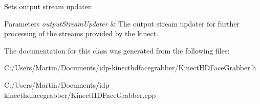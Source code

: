 Sets output stream updater. 


\begin{DoxyParams}{Parameters}
{\em output\+Stream\+Updater} & The output stream updater for further processing of the streams provided by the kinect. \\
\hline
\end{DoxyParams}


The documentation for this class was generated from the following files\+:\begin{DoxyCompactItemize}
\item 
C\+:/\+Users/\+Martin/\+Documents/idp-\/kinecthdfacegrabber/Kinect\+H\+D\+Face\+Grabber.\+h\item 
C\+:/\+Users/\+Martin/\+Documents/idp-\/kinecthdfacegrabber/Kinect\+H\+D\+Face\+Grabber.\+cpp\end{DoxyCompactItemize}

